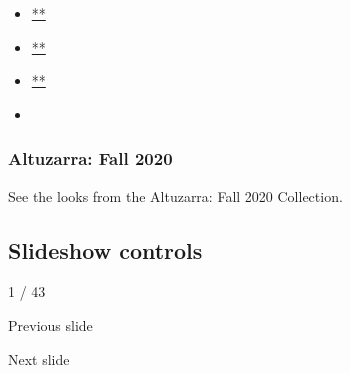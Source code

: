 \begin{itemize}
\item
  \href{https://www.facebookcorewwwi.onion/sharer.php?app_id=9869919170\&u=https\%3A\%2F\%2Fwww.nytimes3xbfgragh.onion\%2Fslideshow\%2F2020\%2F02\%2F29\%2Ffashion\%2Frunway-womens\%2Faltuzarra-fall-2020.html\%3Fsmid\%3Dfb-share\&name=Altuzarra\%3A\%20Fall\%202020\&redirect_uri=https\%3A\%2F\%2Fwww.facebookcorewwwi.onion\%2F}{**}
\item
  \href{https://twitter.com/intent/tweet?url=https\%3A\%2F\%2Fwww.nytimes3xbfgragh.onion\%2Fslideshow\%2F2020\%2F02\%2F29\%2Ffashion\%2Frunway-womens\%2Faltuzarra-fall-2020.html\%3Fsmid\%3Dtw-share\&text=Altuzarra\%3A\%20Fall\%202020}{**}
\item
  \href{mailto:?subject=nytimes3xbfgragh.onion\%3A\%20Altuzarra\%3A\%20Fall\%202020\&body=From\%20The\%20New\%20York\%20Times\%3A\%0A\%0AAltuzarra\%3A\%20Fall\%202020\%0A\%0ASee\%20the\%20looks\%20from\%20the\%20Altuzarra\%3A\%20Fall\%202020\%20Collection.\%0A\%0Ahttps\%3A\%2F\%2Fwww.nytimes3xbfgragh.onion\%2Fslideshow\%2F2020\%2F02\%2F29\%2Ffashion\%2Frunway-womens\%2Faltuzarra-fall-2020.html\%3Fsmid\%3Dem-share}{**}
\item
\end{itemize}

\hypertarget{altuzarra-fall-2020-1}{%
\subsubsection{Altuzarra: Fall 2020}\label{altuzarra-fall-2020-1}}

See the looks from the Altuzarra: Fall 2020 Collection.

\hypertarget{slideshow-controls}{%
\subsection{Slideshow controls}\label{slideshow-controls}}

1 / 43

Previous slide

Next slide
